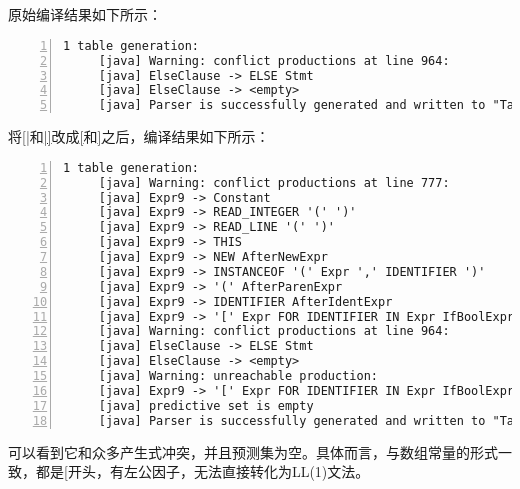 \documentclass[a4paper]{article}
\begin{document}
\section{}
原始编译结果如下所示：
\begin{lstlisting}[basicstyle=\ttfamily\small, numbers=left, frame=shadowbox, rulesepcolor=\color{red!20!green!20!blue!20},extendedchars=true,breaklines=true]
1 table generation:
     [java] Warning: conflict productions at line 964:
     [java] ElseClause -> ELSE Stmt
     [java] ElseClause -> <empty>
     [java] Parser is successfully generated and written to "Table.java"
\end{lstlisting}
将\uline{[|}和\uline{|]}改成\uline{[}和\uline{]}之后，编译结果如下所示：
\begin{lstlisting}[basicstyle=\ttfamily\small, numbers=left, frame=shadowbox, rulesepcolor=\color{red!20!green!20!blue!20},extendedchars=true,breaklines=true]
1 table generation:
     [java] Warning: conflict productions at line 777:
     [java] Expr9 -> Constant
     [java] Expr9 -> READ_INTEGER '(' ')'
     [java] Expr9 -> READ_LINE '(' ')'
     [java] Expr9 -> THIS
     [java] Expr9 -> NEW AfterNewExpr
     [java] Expr9 -> INSTANCEOF '(' Expr ',' IDENTIFIER ')'
     [java] Expr9 -> '(' AfterParenExpr
     [java] Expr9 -> IDENTIFIER AfterIdentExpr
     [java] Expr9 -> '[' Expr FOR IDENTIFIER IN Expr IfBoolExpr ']'
     [java] Warning: conflict productions at line 964:
     [java] ElseClause -> ELSE Stmt
     [java] ElseClause -> <empty>
     [java] Warning: unreachable production:
     [java] Expr9 -> '[' Expr FOR IDENTIFIER IN Expr IfBoolExpr ']'
     [java] predictive set is empty
     [java] Parser is successfully generated and written to "Table.java"
\end{lstlisting}
可以看到它和众多产生式冲突，并且预测集为空。具体而言，与数组常量的形式一致，都是\uline{[}开头，有左公因子，无法直接转化为LL(1)文法。
\end{document}
